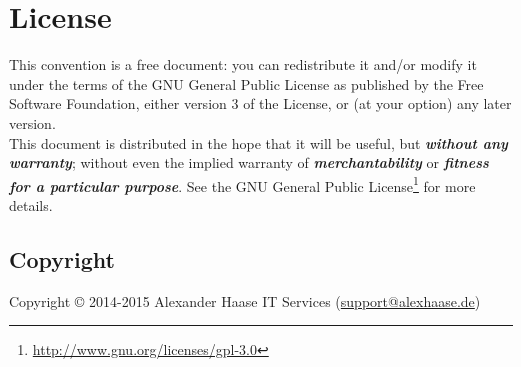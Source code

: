 %
%
%
%
%
%
%

\section{License}

This convention is a free document: you can redistribute it and/or modify it
under the terms of the GNU General Public License as published by the Free
Software Foundation, either version 3 of the License, or (at your option) any
later version. \\

This document is distributed in the hope that it will be useful, but
\textit{\textbf{without any warranty}}; without even the implied warranty of
\textit{\textbf{merchantability}} or
\textit{\textbf{fitness for a particular purpose}}. See the GNU General Public
License\footnote{\url{http://www.gnu.org/licenses/gpl-3.0}} for more details.



\subsection{Copyright}

Copyright \copyright{} 2014-2015 Alexander Haase IT Services
	(\href{mailto:support@alexhaase.de}{support@alexhaase.de})
